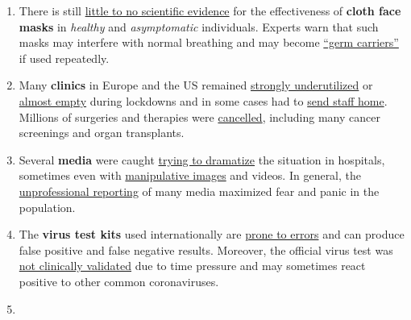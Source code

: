 \begin{enumerate}
{  smear infections} (i.e. on surfaces), but \emph{direct} contact and
  \emph{droplets} produced when talking or coughing. However, in
  \href{https://jamanetwork.com/journals/jama/fullarticle/2768396}{some
  circumstances}, indoor aerosol transmission appears to be possible.
\item
  There is still \href{https://swprs.org/face-masks-evidence/}{little to
  no scientific evidence} for the effectiveness of \textbf{cloth face
  masks} in \emph{healthy} and \emph{asymptomatic} individuals. Experts
  warn that such masks may interfere with normal breathing and may
  become
  \href{https://www.independent.co.uk/news/health/coronavirus-news-face-masks-increase-risk-infection-doctor-jenny-harries-a9396811.html}{``germ
  carriers''} if used repeatedly.
\item
  Many \textbf{clinics} in Europe and the US remained
  \href{https://www.hsj.co.uk/acute-care/nhs-hospitals-have-four-times-more-empty-beds-than-normal/7027392.article}{strongly
  underutilized} or
  \href{https://www.sfchronicle.com/bayarea/article/Stanford-hospital-system-to-cut-pay-20-furlough-15227591.php}{almost
  empty} during lockdowns and in some cases had to
  \href{https://www.usatoday.com/story/news/health/2020/04/02/coronavirus-pandemic-jobs-us-health-care-workers-furloughed-laid-off/5102320002/}{send
  staff home}. Millions of surgeries and therapies were
  \href{https://www.birmingham.ac.uk/news/latest/2020/05/covid-disruption-28-million-surgeries-cancelled.aspx}{cancelled},
  including many cancer screenings and organ transplants.
\item
  Several \textbf{media} were caught
  \href{https://nypost.com/2020/04/01/cbs-admits-to-using-footage-from-italy-in-report-about-nyc/}{trying
  to dramatize} the situation in hospitals, sometimes even with
  \href{https://www.wsj.com/articles/cbs-says-fake-news-wasnt-theirs-11588789238}{manipulative
  images} and videos. In general, the
  \href{https://onlinelibrary.wiley.com/doi/full/10.1111/eci.13222}{unprofessional
  reporting} of many media maximized fear and panic in the population.
\item
  The \textbf{virus test kits} used internationally are
  \href{https://www.ncbi.nlm.nih.gov/pubmed/32219885}{prone to errors}
  and can produce false positive and false negative results. Moreover,
  the official virus test was
  \href{https://www.youtube.com/watch?v=p_AyuhbnPOI}{not clinically
  validated} due to time pressure and may sometimes react positive to
  other common coronaviruses.
\item

\end{enumerate}
